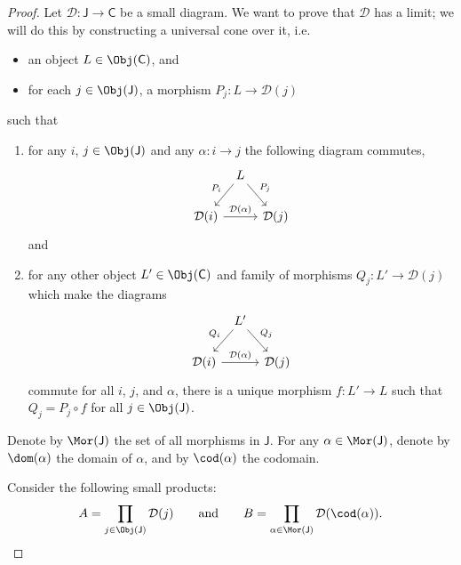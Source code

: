 \documentclass[notes.tex]{subfiles}
\begin{document}
\begin{proof}
  Let $\mathcal{D}\colon \mathsf{J} \rightarrow \mathsf{C}$ be a small diagram. We want to prove that $\mathcal{D}$ has a limit; we will do this by constructing a universal cone over it, i.e.
  \begin{itemize}
    \item an object $L \in \Obj(\mathsf{C})$, and
    \item for each $j \in \Obj(\mathsf{J})$, a morphism $P_{j}\colon L \to \mathcal{D}(j)$
  \end{itemize}
  such that
  \begin{enumerate}
    \item for any $i$, $j \in \Obj(\mathsf{J})$ and any $\alpha\colon i \to j$ the following diagram commutes,
      \begin{equation*}
        \begin{tikzcd}[column sep=tiny]
          & L
          \arrow[dl, swap, "P_{i}"]
          \arrow[dr, "P_{j}"]
          \\
          \mathcal{D}(i)
          \arrow[rr, "\mathcal{D}(\alpha)"]
          & & \mathcal{D}(j)
        \end{tikzcd}
      \end{equation*}
      and
    \item for any other object $L' \in \Obj(\mathsf{C})$ and family of morphisms $Q_{j}\colon L' \to \mathcal{D}(j)$ which make the diagrams
      \begin{equation*}
        \begin{tikzcd}[column sep=tiny]
          & L'
          \arrow[dl, swap, "Q_{i}"]
          \arrow[dr, "Q_{j}"]
          \\
          \mathcal{D}(i)
          \arrow[rr, "\mathcal{D}(\alpha)"]
          & & \mathcal{D}(j)
        \end{tikzcd}
      \end{equation*}
      commute for all $i$, $j$, and $\alpha$, there is a unique morphism $f\colon L' \to L$ such that $Q_{j} = P_{j} \circ f$ for all $j \in \Obj(\mathsf{J})$.
  \end{enumerate}

  Denote by $\Mor(\mathsf{J})$ the set of all morphisms in $\mathsf{J}$. For any $\alpha \in \Mor(\mathsf{J})$, denote by $\dom(\alpha)$ the domain of $\alpha$, and by $\cod(\alpha)$ the codomain.

  Consider the following small products:
  \begin{equation*}
    A = \prod_{j \in \Obj(\mathsf{J})} \mathcal{D}(j)\qquad\text{and}\qquad B = \prod_{\alpha \in \Mor(\mathsf{J})} \mathcal{D}(\cod(\alpha)).
  \end{equation*}


\end{proof}
\end{document}

